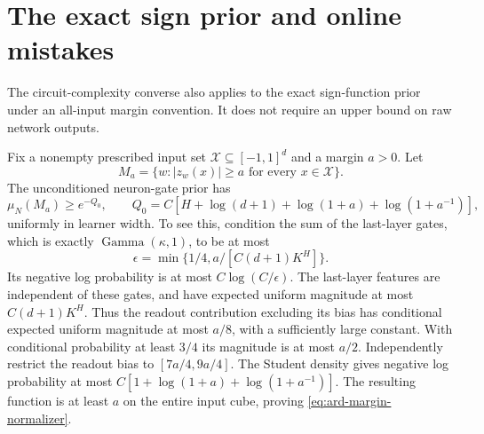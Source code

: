 \section{The exact sign prior and online mistakes}
\label{sec:ard-sign-prior}
The circuit-complexity converse also applies to the exact sign-function prior under an all-input margin convention. It does not require an upper bound on raw network outputs.

Fix a nonempty prescribed input set $\mathcal X\subseteq[-1,1]^d$ and a margin $a>0$. Let
\[
 M_a=\{w:|z_w(x)|\ge a\text{ for every }x\in\mathcal X\}.
\]
The unconditioned neuron-gate prior has
\begin{equation}
 \mu_N(M_a)\ge e^{-Q_0},\qquad
 Q_0=C\left[H+\log(d+1)+\log(1+a)+\log(1+a^{-1})\right],
 \label{eq:ard-margin-normalizer}
\end{equation}
uniformly in learner width. To see this, condition the sum of the last-layer gates, which is exactly $\operatorname{Gamma}(\kappa,1)$, to be at most
\[
 \epsilon=\min\{1/4,a/[C(d+1)K^H]\}.
\]
Its negative log probability is at most $C\log(C/\epsilon)$. The last-layer features are independent of these gates, and have expected uniform magnitude at most $C(d+1)K^H$. Thus the readout contribution excluding its bias has conditional expected uniform magnitude at most $a/8$, with a sufficiently large constant. With conditional probability at least $3/4$ its magnitude is at most $a/2$. Independently restrict the readout bias to $[7a/4,9a/4]$. The Student density gives negative log probability at most $C[1+\log(1+a)+\log(1+a^{-1})]$. The resulting function is at least $a$ on the entire input cube, proving \eqref{eq:ard-margin-normalizer}.

